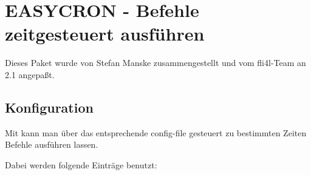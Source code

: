 {
\section {EASYCRON - Befehle zeitgesteuert ausführen}
}

Dieses Paket wurde von Stefan Manske
 zusammengestellt und vom
fli4l-Team an 2.1 angepaßt.


\subsection{Konfiguration}


       Mit  kann man über das entsprechende config-file
       gesteuert zu bestimmten Zeiten Befehle ausführen lassen.

       Dabei werden folgende Einträge benutzt:


